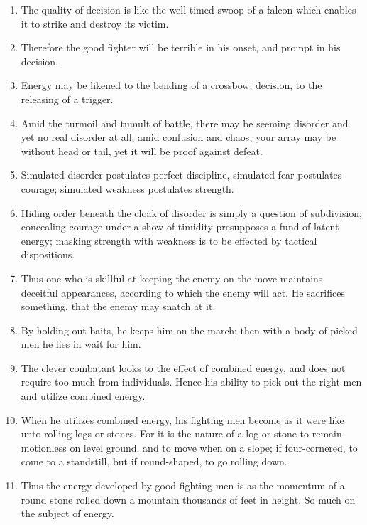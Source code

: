 \documentclass[oneside]{book}
\begin{document}
\begin{enumerate}
	\item The quality of decision is like the well-timed swoop of a falcon which enables it to strike and destroy its victim.
	\item Therefore the good fighter will be terrible in his onset, and prompt in his decision.
	\item Energy may be likened to the bending of a crossbow; decision, to the releasing of a trigger.
	\item Amid the turmoil and tumult of battle, there may be seeming disorder and yet no real disorder at all; amid confusion and chaos, your array may be without head or tail, yet it will be proof against defeat.
	\item Simulated disorder postulates perfect discipline, simulated fear postulates courage; simulated weakness postulates strength.
	\item Hiding order beneath the cloak of disorder is simply a question of subdivision; concealing courage under a show of timidity presupposes a fund of latent energy; masking strength with weakness is to be effected by tactical dispositions.
	\item Thus one who is skillful at keeping the enemy on the move maintains deceitful appearances, according to which the enemy will act. He sacrifices something, that the enemy may snatch at it.
	\item By holding out baits, he keeps him on the march; then with a body of picked men he lies in wait for him.
	\item The clever combatant looks to the effect of combined energy, and does not require too much from individuals. Hence his ability to pick out the right men and utilize combined energy.
	\item When he utilizes combined energy, his fighting men become as it were like unto rolling logs or stones. For it is the nature of a log or stone to remain motionless on level ground, and to move when on a slope; if four-cornered, to come to a standstill, but if round-shaped, to go rolling down.
	\item Thus the energy developed by good fighting men is as the momentum of a round stone rolled down a mountain thousands of feet in height. So much on the subject of energy.
\end{enumerate}
\end{document}
